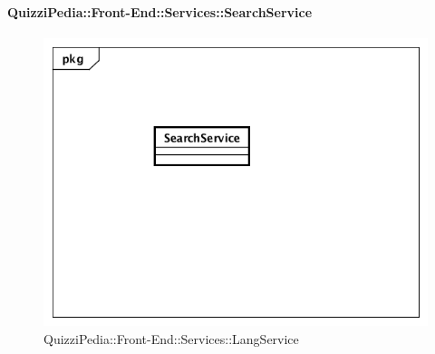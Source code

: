 \paragraph{QuizziPedia::Front-End::Services::SearchService}
\begin{figure}
	\centering
	\includegraphics[scale=0.45]{UML/Classi/Front-End/QuizziPedia_Front-end_Services_ SearchService.png}
	\caption{QuizziPedia::Front-End::Services::LangService}
\end{figure}
